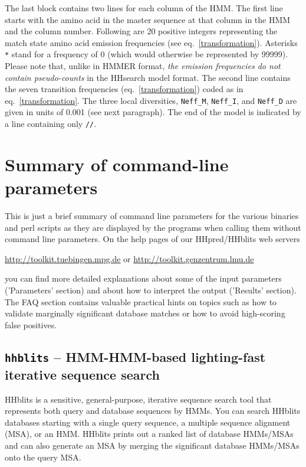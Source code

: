 \documentclass[11pt,a4paper]{article}
\begin{document}
 The last block contains two lines for each column of the HMM. The first line starts with the amino acid in the master sequence at that column in the HMM and the column number. Following are 20  positive integers representing the match state amino acid emission frequencies (see eq.\ \ref{transformation}). Asterisks \verb`*` stand for a frequency of 0 (which would otherwise be represented by 99999). Please note that, unlike in HMMER format,  \emph{the emission frequencies do not contain pseudo-counts} in the HHsearch model format. The second line contains the seven transition frequencies (eq.\ \ref{transformation}) coded as in eq.\ \ref{transformation}. The three local diversities, \verb`Neff_M`, \verb`Neff_I`, and \verb`Neff_D` are given in units of 0.001 (see next paragraph). The end of the model is indicated by a line containing only \verb`//`.


\section{Summary of command-line parameters}

This is just a brief summary of command line parameters for the various binaries and
perl scripts as they are displayed by the programs when calling them without 
command line parameters. On the help pages of our HHpred/HHblits web servers

\url{http://toolkit.tuebingen.mpg.de} or \url{http://toolkit.genzentrum.lmu.de}

you can find more detailed explanations about some of the input parameters 
('Parameters' section) and about how to interpret the output ('Results' section). The FAQ 
section contains valuable practical hints on topics such as how to validate marginally
significant database matches or how to avoid high-scoring false positives.


\subsection{{\tt hhblits} -- HMM-HMM-based lighting-fast iterative sequence search}

HHblits is a sensitive, general-purpose, iterative sequence search tool that represents
both query and database sequences by HMMs. You can search HHblits databases starting
with a single query sequence, a multiple sequence alignment (MSA), or an HMM. HHblits
prints out a ranked list of database HMMs/MSAs and can also generate an MSA by merging
the significant database HMMs/MSAs onto the query MSA.
\end{document}
